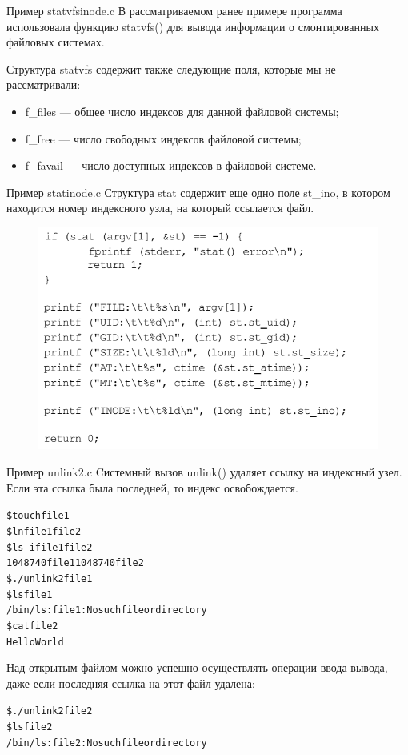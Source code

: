 \documentclass{beamer}
\begin{document}
\begin{frame}[fragile]{Пример statvfsinode.c}
В рассматриваемом ранее примере программа использовала функцию statvfs() для вывода информации о смонтированных файловых системах. 

Структура statvfs содержит также следующие поля, которые мы не рассматривали:
\begin{itemize}
\item f\_files — общее число индексов для данной файловой системы;
\item f\_free — число свободных индексов файловой системы;
\item f\_favail — число доступных индексов в файловой системе.
\end{itemize}
\end{frame}

\begin{frame}[fragile]{Пример statinode.c}
Структура stat содержит еще одно поле st\_ino, в котором находится номер индексного узла, на который ссылается файл.
\begin{figure}[h]
\centering
\includegraphics[scale=0.5]{images/lec10-pic01.png}
\end{figure}
\end{frame}

\begin{frame}[fragile]{Пример unlink2.c}
Cистемный вызов unlink() удаляет ссылку на индексный узел. Если эта ссылка была последней, то индекс освобождается.
\begin{alltt}
\$ touch file1
\$ ln file1 file2
\$ ls -i file1 file2
1048740 file1 1048740 file2
\$ ./unlink2 file1
\$ ls file1
/bin/ls: file1: No such file or directory
\$ cat file2
Hello World
\end{alltt}
Над открытым файлом можно успешно осуществлять операции ввода-вывода, даже если последняя ссылка на этот файл удалена:
\begin{alltt}
\$ ./unlink2 file2
\$ ls file2
/bin/ls: file2: No such file or directory
\end{alltt}
\end{frame}
\end{document}
